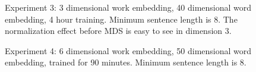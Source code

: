 \documentclass{article}%
\begin{document}
\bigskip


\begin{figure}
\noindent{}
\caption{Experiment 3: 3 dimensional work embedding, 40 dimensional word embedding, 4 hour training.  Minimum sentence length is 8. The normalization effect before MDS is easy to see in dimension 3. }
\end{figure}



\bigskip


\begin{figure}
\noindent{}
\caption{Experiment 4: 6 dimensional work embedding, 50 dimensional word embedding, trained for 90 minutes. Minimum sentence length is 8.}
\end{figure}


\bigskip
\end{document}
